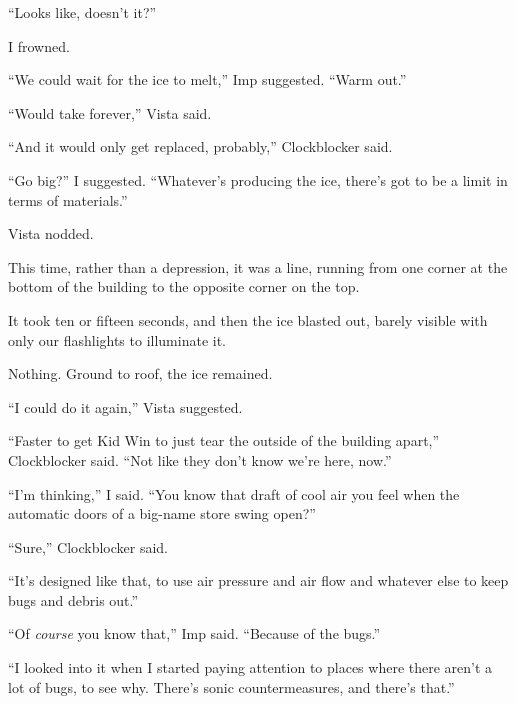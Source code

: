 ``Looks like, doesn't it?''



I frowned.



``We could wait for the ice to melt,'' Imp suggested.  ``Warm out.''



``Would take forever,'' Vista said.



``And it would only get replaced, probably,'' Clockblocker said.



``Go big?'' I suggested.  ``Whatever's producing the ice, there's got to be a limit in terms of materials.''



Vista nodded.



This time, rather than a depression, it was a line, running from one corner at the bottom of the building to the opposite corner on the top.



It took ten or fifteen seconds, and then the ice blasted out, barely visible with only our flashlights to illuminate it.



Nothing.  Ground to roof, the ice remained.



``I could do it again,'' Vista suggested.



``Faster to get Kid Win to just tear the outside of the building apart,'' Clockblocker said.  ``Not like they don't know we're here, now.''



``I'm thinking,'' I said.  ``You know that draft of cool air you feel when the automatic doors of a big-name store swing open?''



``Sure,'' Clockblocker said.



``It's designed like that, to use air pressure and air flow and whatever else to keep bugs and debris out.''



``Of \emph{course} you know that,'' Imp said.  ``Because of the bugs.''



``I looked into it when I started paying attention to places where there aren't a lot of bugs, to see why.  There's sonic countermeasures, and there's that.''



